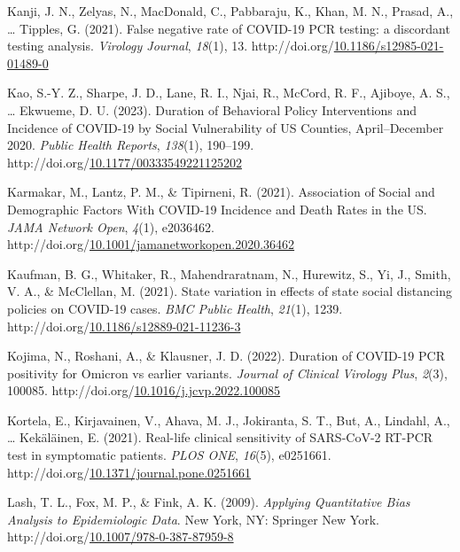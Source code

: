 \documentclass[12pt,twoside]{smiththesis}
\newlength{\cslhangindent}
\newenvironment{CSLReferences}[2] %
 {%
\setlength{\parindent}{0pt}
\ifodd #1 \everypar{\setlength{\hangindent}{\cslhangindent}}\ignorespaces\fi
\ifnum #2 > 0
\setlength{\parskip}{#2\baselineskip}
  \fi
}%
{}
\begin{document}
\begin{CSLReferences}{1}{0}
\leavevmode{}%
Kanji, J. N., Zelyas, N., MacDonald, C., Pabbaraju, K., Khan, M. N., Prasad, A., \ldots{} Tipples, G. (2021). False negative rate of COVID-19 PCR testing: a discordant testing analysis. \emph{Virology Journal}, \emph{18}(1), 13. http://doi.org/\href{https://doi.org/10.1186/s12985-021-01489-0}{10.1186/s12985-021-01489-0}

\leavevmode{}%
Kao, S.-Y. Z., Sharpe, J. D., Lane, R. I., Njai, R., McCord, R. F., Ajiboye, A. S., \ldots{} Ekwueme, D. U. (2023). Duration of Behavioral Policy Interventions and Incidence of COVID-19 by Social Vulnerability of US Counties, April--December 2020. \emph{Public Health Reports}, \emph{138}(1), 190--199. http://doi.org/\href{https://doi.org/10.1177/00333549221125202}{10.1177/00333549221125202}

\leavevmode{}%
Karmakar, M., Lantz, P. M., \& Tipirneni, R. (2021). Association of Social and Demographic Factors With COVID-19 Incidence and Death Rates in the US. \emph{JAMA Network Open}, \emph{4}(1), e2036462. http://doi.org/\href{https://doi.org/10.1001/jamanetworkopen.2020.36462}{10.1001/jamanetworkopen.2020.36462}

\leavevmode{}%
Kaufman, B. G., Whitaker, R., Mahendraratnam, N., Hurewitz, S., Yi, J., Smith, V. A., \& McClellan, M. (2021). State variation in effects of state social distancing policies on COVID-19 cases. \emph{BMC Public Health}, \emph{21}(1), 1239. http://doi.org/\href{https://doi.org/10.1186/s12889-021-11236-3}{10.1186/s12889-021-11236-3}

\leavevmode{}%
Kojima, N., Roshani, A., \& Klausner, J. D. (2022). Duration of COVID-19 PCR positivity for Omicron vs earlier variants. \emph{Journal of Clinical Virology Plus}, \emph{2}(3), 100085. http://doi.org/\href{https://doi.org/10.1016/j.jcvp.2022.100085}{10.1016/j.jcvp.2022.100085}

\leavevmode{}%
Kortela, E., Kirjavainen, V., Ahava, M. J., Jokiranta, S. T., But, A., Lindahl, A., \ldots{} Kekäläinen, E. (2021). Real-life clinical sensitivity of SARS-CoV-2 RT-PCR test in symptomatic patients. \emph{PLOS ONE}, \emph{16}(5), e0251661. http://doi.org/\href{https://doi.org/10.1371/journal.pone.0251661}{10.1371/journal.pone.0251661}

\leavevmode{}%
Lash, T. L., Fox, M. P., \& Fink, A. K. (2009). \emph{Applying Quantitative Bias Analysis to Epidemiologic Data}. New York, NY: Springer New York. http://doi.org/\href{https://doi.org/10.1007/978-0-387-87959-8}{10.1007/978-0-387-87959-8}


\end{CSLReferences}
\end{document}
